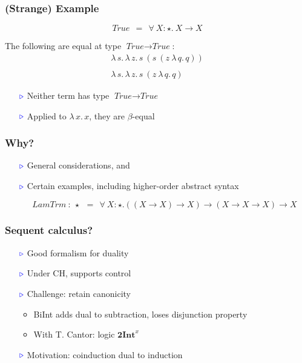 \documentclass[11pt]{beamer}
\newcommand{\myb}[0]{\ensuremath{\textcolor{blue}{\triangleright}}}
\begin{document}
\begin{frame}
  \frametitle{(Strange) Example}

  \[
  \textit{True}\ \ =\ \ \forall\ X:\star.\ X \to X
  \]

  The following are equal at type $\textit{True}\to\textit{True}$:
  \[
  \begin{array}{l}
    \lambda\,s.\,\lambda\,z.\, s\ (s\ (z\ \lambda\, q.\,q))\\ \\
    \lambda\,s.\,\lambda\,z.\, s\ (z\ \lambda\, q.\,q)
  \end{array}
  \]

  \begin{itemize}
  \item[$\myb$] Neither term has type $\textit{True}\to\textit{True}$
  \item[$\myb$] Applied to $\lambda\,x.\,x$, they are $\beta$-equal
  \end{itemize}
\end{frame}

\begin{frame}
  \frametitle{Why?}

  \begin{itemize}
  \item[$\myb$] General considerations, and

\vspace{1cm}

  \item[$\myb$] Certain examples, including higher-order abstract syntax

    \[
    \textit{LamTrm}\ : \ \star \ \ = \ \ \forall\ X:\star.((X \to X) \to X) \to (X \to X \to X) \to X
    \]
    \end{itemize}
\end{frame}

\begin{frame}
  \frametitle{Sequent calculus?}

  \begin{itemize}
  \item[$\myb$] Good formalism for duality

\vspace{.2cm}

\item[$\myb$] Under CH, supports control

  \vspace{.2cm}

\item[$\myb$] Challenge: retain canonicity

  \begin{itemize}
  \item BiInt adds dual to subtraction, loses disjunction property
  \item With T. Cantor: logic $\textbf{2Int}^{x}$
  \end{itemize}

  \vspace{.2cm}

  \item[$\myb$] Motivation: coinduction dual to induction
\end{itemize}

\end{frame}
\end{document}
